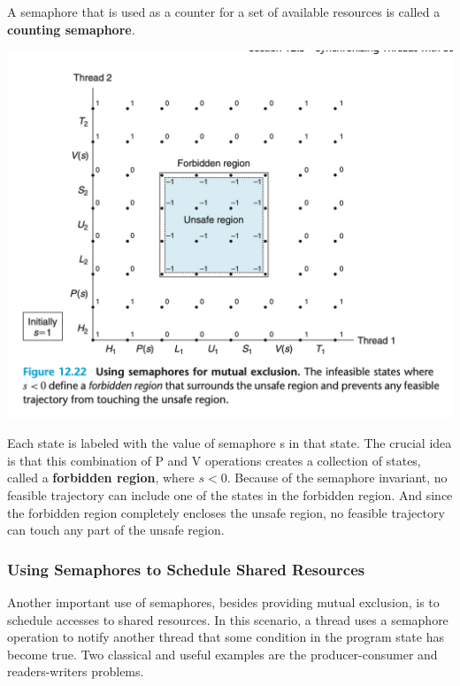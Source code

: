 \documentclass[11pt]{article}
\begin{document}
A semaphore that is used as a counter for a set of available resources is called a \textbf{counting semaphore}.\\


\begin{center}
\includegraphics[width=.9\linewidth]{pics/figure12.22-using-semaphores-for-mutual-exclusion.png}
\end{center}



Each state is labeled with the value of semaphore s in that state. The crucial idea is that this combination of P and V operations creates a collection of states, called a \textbf{forbidden region}, where \(s < 0\). Because of the semaphore invariant, no feasible trajectory can include one of the states in the forbidden region. And since the forbidden region completely encloses the unsafe region, no feasible trajectory can touch any part of the unsafe region.\\

\subsubsection{Using Semaphores to Schedule Shared Resources}
\label{sec:org8d9c579}
Another important use of semaphores, besides providing mutual exclusion, is to schedule accesses to shared resources. In this scenario, a thread uses a semaphore operation to notify another thread that some condition in the program state has become true. Two classical and useful examples are the producer-consumer and readers-writers problems.\\
\end{document}
